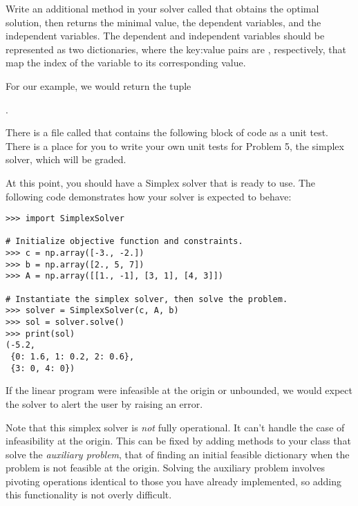\begin{problem}
Write an additional method in your solver called  that obtains the optimal solution, then returns the minimal value, the dependent variables, and the independent variables.
The dependent and independent variables should be represented as two dictionaries, where the key:value pairs are , respectively, that map the index of the variable to its
corresponding value.

For our example, we would return the tuple

.
\end{problem}

\begin{unittest}
There is a file called  that contains the following block of code as a unit test. There is a place for you to write your own unit tests for Problem 5, the simplex solver, which will be graded.
\end{unittest}

\vspace{5mm}

At this point, you should have a Simplex solver that is ready to use.
The following code demonstrates how your solver is expected to behave:

\vspace{5mm}

\begin{lstlisting}
>>> import SimplexSolver

# Initialize objective function and constraints.
>>> c = np.array([-3., -2.])
>>> b = np.array([2., 5, 7])
>>> A = np.array([[1., -1], [3, 1], [4, 3]])

# Instantiate the simplex solver, then solve the problem.
>>> solver = SimplexSolver(c, A, b)
>>> sol = solver.solve()
>>> print(sol)
(-5.2,
 {0: 1.6, 1: 0.2, 2: 0.6},
 {3: 0, 4: 0})
\end{lstlisting}

If the linear program were infeasible at the origin or unbounded, we would expect the solver to alert the user by raising an error.

Note that this simplex solver is \emph{not} fully operational.
It can't handle the case of infeasibility at the origin.
This can be fixed by adding methods to your class that solve the \emph{auxiliary problem}, that of finding an initial feasible dictionary when the problem is not feasible at the origin.
Solving the auxiliary problem involves pivoting operations identical to those you have already implemented, so adding this functionality
is not overly difficult.

